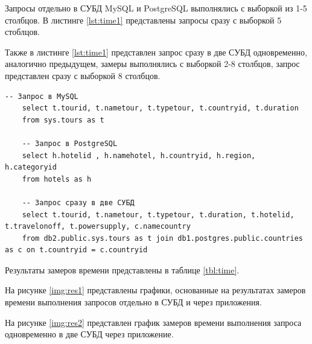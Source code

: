 Запросы отдельно в СУБД MySQL и PostgreSQL выполнялись с выборкой из 1-5 столбцов. В листинге \ref{lst:time1} представлены запросы сразу с выборкой 5 стоблцов.

Также в листинге \ref{lst:time1} представлен запрос сразу в две СУБД одновременно, аналогично предыдущем, замеры выполнялись с выборкой 2-8 столбцов, запрос представлен сразу с выборкой 8 столбцов.


\begin{center}
	\captionsetup{justification=raggedright,singlelinecheck=off}
	\begin{lstlisting}[label=lst:time1,caption=Запросы для проведения эксперимента]
	-- Запрос в MySQL
	select t.tourid, t.nametour, t.typetour, t.countryid, t.duration
	from sys.tours as t
	
	-- Запрос в PostgreSQL 
	select h.hotelid , h.namehotel, h.countryid, h.region, h.categoryid
	from hotels as h
	
	-- Запрос сразу в две СУБД
	select t.tourid, t.nametour, t.typetour, t.duration, t.hotelid, t.travelonoff, t.powersupply, c.namecountry
	from db2.public.sys.tours as t join db1.postgres.public.countries as c on t.countryid = c.countryid
	\end{lstlisting}
\end{center}

Результаты замеров времени представлены в таблице \ref{tbl:time}.

На рисунке \ref{img:res1} представлены графики, основанные на результатах замеров времени выполнения запросов отдельно в СУБД и через приложения.

На рисунке \ref{img:res2} представлен график замеров времени выполнения запроса одновременно в две СУБД через приложение.



